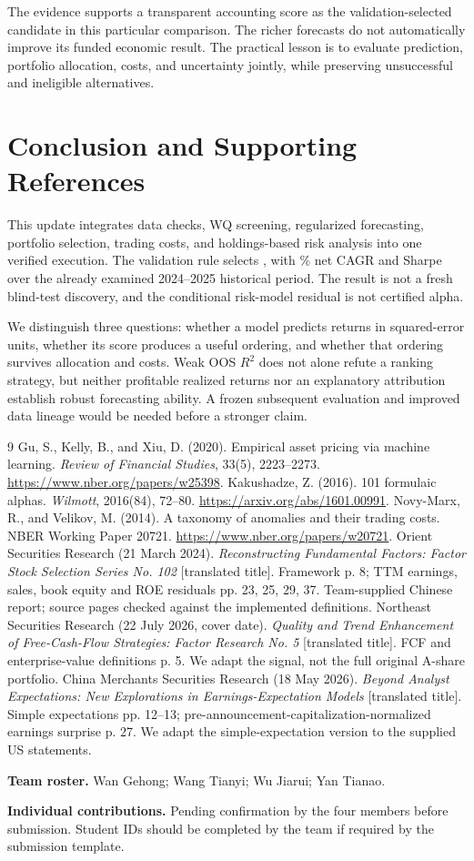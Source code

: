 \documentclass[11pt]{article}
\begin{document}
The evidence supports a transparent accounting score as the validation-selected candidate in this particular comparison. The richer forecasts do not automatically improve its funded economic result. The practical lesson is to evaluate prediction, portfolio allocation, costs, and uncertainty jointly, while preserving unsuccessful and ineligible alternatives.
\clearpage

\section{Conclusion and Supporting References}
This update integrates data checks, WQ screening, regularized forecasting, portfolio selection, trading costs, and holdings-based risk analysis into one verified execution. The validation rule selects \SelectedName{}, with \SelectedCAGR\% net CAGR and \SelectedSharpe{} Sharpe over the already examined 2024--2025 historical period. The result is not a fresh blind-test discovery, and the conditional risk-model residual is not certified alpha.

We distinguish three questions: whether a model predicts returns in squared-error units, whether its score produces a useful ordering, and whether that ordering survives allocation and costs. Weak OOS $R^2$ does not alone refute a ranking strategy, but neither profitable realized returns nor an explanatory attribution establish robust forecasting ability. A frozen subsequent evaluation and improved data lineage would be needed before a stronger claim.

\begin{thebibliography}{9}
 Gu, S., Kelly, B., and Xiu, D. (2020). Empirical asset pricing via machine learning. \emph{Review of Financial Studies}, 33(5), 2223--2273. \url{https://www.nber.org/papers/w25398}.
 Kakushadze, Z. (2016). 101 formulaic alphas. \emph{Wilmott}, 2016(84), 72--80. \url{https://arxiv.org/abs/1601.00991}.
 Novy-Marx, R., and Velikov, M. (2014). A taxonomy of anomalies and their trading costs. NBER Working Paper 20721. \url{https://www.nber.org/papers/w20721}.
 Orient Securities Research (21 March 2024). \emph{Reconstructing Fundamental Factors: Factor Stock Selection Series No. 102} [translated title]. Framework p. 8; TTM earnings, sales, book equity and ROE residuals pp. 23, 25, 29, 37. Team-supplied Chinese report; source pages checked against the implemented definitions.
 Northeast Securities Research (22 July 2026, cover date). \emph{Quality and Trend Enhancement of Free-Cash-Flow Strategies: Factor Research No. 5} [translated title]. FCF and enterprise-value definitions p. 5. We adapt the signal, not the full original A-share portfolio.
 China Merchants Securities Research (18 May 2026). \emph{Beyond Analyst Expectations: New Explorations in Earnings-Expectation Models} [translated title]. Simple expectations pp. 12--13; pre-announcement-capitalization-normalized earnings surprise p. 27. We adapt the simple-expectation version to the supplied US statements.
\end{thebibliography}

\textbf{Team roster.} Wan Gehong; Wang Tianyi; Wu Jiarui; Yan Tianao.

\textbf{Individual contributions.} Pending confirmation by the four members before submission. Student IDs should be completed by the team if required by the submission template.
\end{document}
